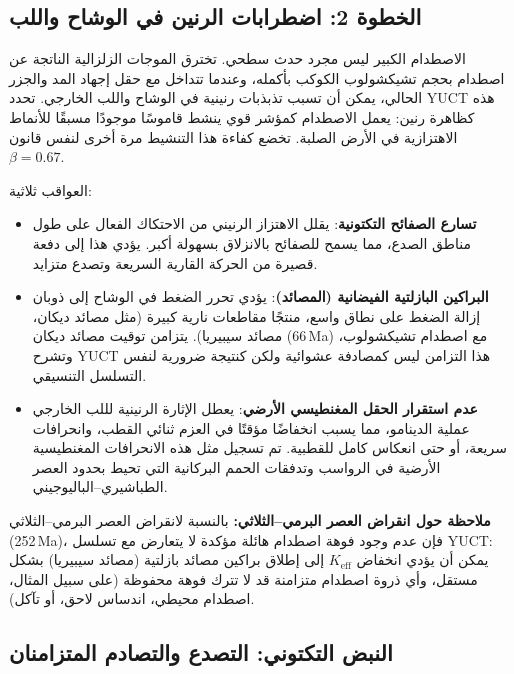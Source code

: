 \documentclass[11pt,a4paper]{article}
\begin{document}
	\subsection{الخطوة 2: اضطرابات الرنين في الوشاح واللب}
	
	الاصطدام الكبير ليس مجرد حدث سطحي. تخترق الموجات الزلزالية الناتجة عن اصطدام بحجم تشيكشولوب الكوكب بأكمله، وعندما تتداخل مع حقل إجهاد المد والجزر الحالي، يمكن أن تسبب تذبذبات رنينية في الوشاح واللب الخارجي. تحدد YUCT هذه كظاهرة رنين: يعمل الاصطدام كمؤشر قوي ينشط قاموسًا موجودًا مسبقًا للأنماط الاهتزازية في الأرض الصلبة. تخضع كفاءة هذا التنشيط مرة أخرى لنفس قانون \(\beta = 0.67\).
	
	العواقب ثلاثية:
	\begin{itemize}
		\item \textbf{تسارع الصفائح التكتونية}: يقلل الاهتزاز الرنيني من الاحتكاك الفعال على طول مناطق الصدع، مما يسمح للصفائح بالانزلاق بسهولة أكبر. يؤدي هذا إلى دفعة قصيرة من الحركة القارية السريعة وتصدع متزايد.
		\item \textbf{البراكين البازلتية الفيضانية (المصائد)}: يؤدي تحرر الضغط في الوشاح إلى ذوبان إزالة الضغط على نطاق واسع، منتجًا مقاطعات نارية كبيرة (مثل مصائد ديكان، مصائد سيبيريا). يتزامن توقيت مصائد ديكان (66 Ma) مع اصطدام تشيكشولوب، وتشرح YUCT هذا التزامن ليس كمصادفة عشوائية ولكن كنتيجة ضرورية لنفس التسلسل التنسيقي.
		\item \textbf{عدم استقرار الحقل المغنطيسي الأرضي}: يعطل الإثارة الرنينية لللب الخارجي عملية الدينامو، مما يسبب انخفاضًا مؤقتًا في العزم ثنائي القطب، وانحرافات سريعة، أو حتى انعكاس كامل للقطبية. تم تسجيل مثل هذه الانحرافات المغنطيسية الأرضية في الرواسب وتدفقات الحمم البركانية التي تحيط بحدود العصر الطباشيري–الباليوجيني.
	\end{itemize}
	
	\noindent
	\textbf{ملاحظة حول انقراض العصر البرمي–الثلاثي:} 
	بالنسبة لانقراض العصر البرمي–الثلاثي (252 Ma)، فإن عدم وجود فوهة اصطدام هائلة مؤكدة لا يتعارض مع تسلسل YUCT: يمكن أن يؤدي انخفاض \(K_{\mathrm{eff}}\) إلى إطلاق براكين مصائد بازلتية (مصائد سيبيريا) بشكل مستقل، وأي ذروة اصطدام متزامنة قد لا تترك فوهة محفوظة (على سبيل المثال، اصطدام محيطي، اندساس لاحق، أو تآكل).
	
	\subsection{النبض التكتوني: التصدع والتصادم المتزامنان}
	
\end{document}
